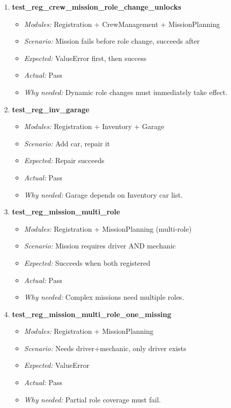 \documentclass{article}
\begin{document}
\begin{enumerate}[resume, label=\textbf{TC\arabic*.}]
\item \textbf{test\_reg\_crew\_mission\_role\_change\_unlocks}
\begin{itemize}[noitemsep]
  \item \textit{Modules:} Registration + CrewManagement + MissionPlanning
  \item \textit{Scenario:} Mission fails before role change, succeeds after
  \item \textit{Expected:} ValueError first, then success
  \item \textit{Actual:} Pass
  \item \textit{Why needed:} Dynamic role changes must immediately take effect.
\end{itemize}

\item \textbf{test\_reg\_inv\_garage}
\begin{itemize}[noitemsep]
  \item \textit{Modules:} Registration + Inventory + Garage
  \item \textit{Scenario:} Add car, repair it
  \item \textit{Expected:} Repair succeeds
  \item \textit{Actual:} Pass
  \item \textit{Why needed:} Garage depends on Inventory car list.
\end{itemize}

\item \textbf{test\_reg\_mission\_multi\_role}
\begin{itemize}[noitemsep]
  \item \textit{Modules:} Registration + MissionPlanning (multi-role)
  \item \textit{Scenario:} Mission requires driver AND mechanic
  \item \textit{Expected:} Succeeds when both registered
  \item \textit{Actual:} Pass
  \item \textit{Why needed:} Complex missions need multiple roles.
\end{itemize}

\item \textbf{test\_reg\_mission\_multi\_role\_one\_missing}
\begin{itemize}[noitemsep]
  \item \textit{Modules:} Registration + MissionPlanning
  \item \textit{Scenario:} Needs driver+mechanic, only driver exists
  \item \textit{Expected:} ValueError
  \item \textit{Actual:} Pass
  \item \textit{Why needed:} Partial role coverage must fail.
\end{itemize}

\end{enumerate}
\end{document}
